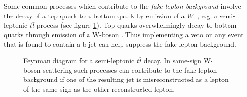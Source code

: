 Some common processes which contribute to the \emph{fake lepton background} involve the decay of a top quark to a bottom quark by emission of a $W^{+}$, e.g. a semi-leptonic $t\bar{t}$ process (see figure \ref{semi-leptonic_ttbar}). Top-quarks overwhelmingly decay to bottom-quarks through emission of a W-boson \cite{PDG}. Thus implementing a veto on any event that is found to contain a b-jet can help suppress the fake lepton background.

\begin{figure}
\caption{Feynman diagram for a semi-leptonic $t\bar{t}$ decay. In same-sign W-boson scattering such processes can contribute to the fake lepton background if one of the resulting jet is misreconstructed as a lepton of the same-sign as the other reconstructed lepton.}
\label{semi-leptonic_ttbar}
\end{figure}